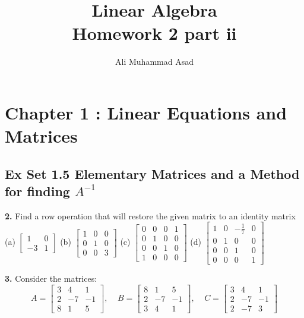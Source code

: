 \documentclass[addpoints]{exam}
\title{Linear Algebra\\ Homework 2 part ii}
\author{Ali Muhammad Asad}
\begin{document}
\maketitle
\section*{\textbf{Chapter 1 : Linear Equations and Matrices}}
\subsection*{\textbf{Ex Set 1.5 Elementary Matrices and a Method for finding $ A^{-1} $}}
\begin{questions}
    \question
    \textbf{2. } Find a row operation that will restore the given matrix to an identity matrix \\
    (a) $ \begin{bmatrix}
        1 & 0 \\ -3 & 1
    \end{bmatrix} $ \hspace{5mm} (b) $ \begin{bmatrix}
        1 & 0 & 0 \\ 0 & 1 & 0 \\ 0 & 0 & 3
    \end{bmatrix} $ \hspace{5mm} (c) $ \begin{bmatrix}
        0 & 0 & 0 & 1 \\ 0 & 1 & 0 & 0 \\ 0 & 0 & 1 & 0 \\ 1 & 0 & 0 & 0
    \end{bmatrix} $ \hspace{5mm} (d) $ \begin{bmatrix}
        1 & 0 & -\frac{1}{7} & 0 \\ 0 & 1 & 0 & 0 \\ 0 & 0 & 1 & 0 \\ 0 & 0 & 0 & 1
    \end{bmatrix} $ 
    \begin{solution}
        
    \end{solution}

    \textbf{3. } Consider the matrices: 
    $$ A = \begin{bmatrix}
        3 & 4 & 1 \\ 2 & -7 & -1 \\ 8 & 1 & 5
    \end{bmatrix}, \;\;\;\; B = \begin{bmatrix}
        8 & 1 & 5 \\ 2 & -7 & -1 \\ 3 & 4 & 1 
    \end{bmatrix}, \;\;\;\; C = \begin{bmatrix}
        3 & 4 & 1 \\ 2 & -7 & -1 \\ 2 & -7 & 3
    \end{bmatrix} $$


\end{questions}
\end{document}
